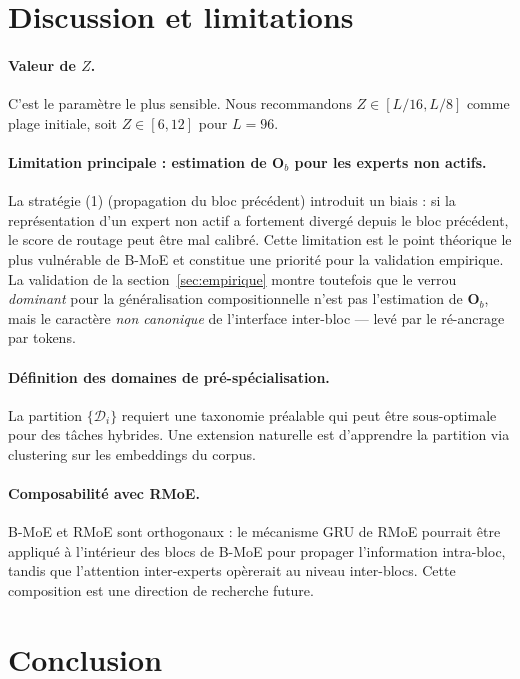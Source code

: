 \documentclass[10pt,a4paper]{article}
\begin{document}
\section{Discussion et limitations}

\paragraph{Valeur de $Z$.}
C'est le paramètre le plus sensible. Nous recommandons $Z \in [L/16, L/8]$ comme plage initiale, soit $Z \in [6, 12]$ pour $L = 96$.

\paragraph{Limitation principale : estimation de $\mathbf{O}_b$ pour les experts non actifs.}
La stratégie (1) (propagation du bloc précédent) introduit un biais : si la représentation d'un expert non actif a fortement divergé depuis le bloc précédent, le score de routage peut être mal calibré. Cette limitation est le point théorique le plus vulnérable de B-MoE et constitue une priorité pour la validation empirique. La validation de la section~\ref{sec:empirique} montre toutefois que le verrou \emph{dominant} pour la généralisation compositionnelle n'est pas l'estimation de $\mathbf{O}_b$, mais le caractère \emph{non canonique} de l'interface inter-bloc --- levé par le ré-ancrage par tokens.

\paragraph{Définition des domaines de pré-spécialisation.}
La partition $\{\mathcal{D}_i\}$ requiert une taxonomie préalable qui peut être sous-optimale pour des tâches hybrides. Une extension naturelle est d'apprendre la partition via clustering sur les embeddings du corpus.

\paragraph{Composabilité avec RMoE.}
B-MoE et RMoE sont orthogonaux : le mécanisme GRU de RMoE pourrait être appliqué à l'intérieur des blocs de B-MoE pour propager l'information intra-bloc, tandis que l'attention inter-experts opèrerait au niveau inter-blocs. Cette composition est une direction de recherche future.

\section{Conclusion}
\end{document}
